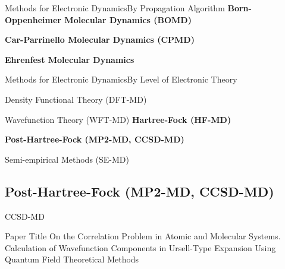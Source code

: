 \begin{frame}{Methods for Electronic Dynamics}{By Propagation Algorithm}
    \textbf{Born-Oppenheimer Molecular Dynamics (BOMD)}
    \vspace{1em}
    
    \textbf{Car-Parrinello Molecular Dynamics (CPMD)}
    \vspace{1em}
    
    \textbf{Ehrenfest Molecular Dynamics}
\end{frame}

\begin{frame}{Methods for Electronic Dynamics}{By Level of Electronic Theory}
    \begin{block}{Density Functional Theory (DFT-MD)}
    \end{block}
    
    \begin{block}{Wavefunction Theory (WFT-MD)}
        \textbf{Hartree-Fock (HF-MD)}
        \vspace{0.5em}
        
        \textbf{Post-Hartree-Fock (MP2-MD, CCSD-MD)}
    \end{block}
    
    \begin{block}{Semi-empirical Methods (SE-MD)}
    \end{block}
\end{frame}

\subsection{Post-Hartree-Fock (MP2-MD, CCSD-MD)}

\begin{frame}{CCSD-MD}
	\begin{block}{Paper Title}
	On the Correlation Problem in Atomic and Molecular Systems. Calculation
of Wavefunction Components in Ursell-Type Expansion Using Quantum
Field Theoretical Methods
	\end{block}
\end{frame}

